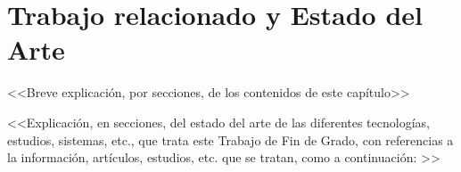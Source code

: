 \chapter{Trabajo relacionado y Estado del Arte} \label{chp:state-of-the-art}

<<Breve explicación, por secciones, de los contenidos de este capítulo>>


<<Explicación, en secciones, del estado del arte de las diferentes tecnologías, estudios, sistemas, etc., que trata este Trabajo de Fin de Grado, con referencias a la información, artículos, estudios, etc. que se tratan, como a continuación: \cite{stallings2006}>>
